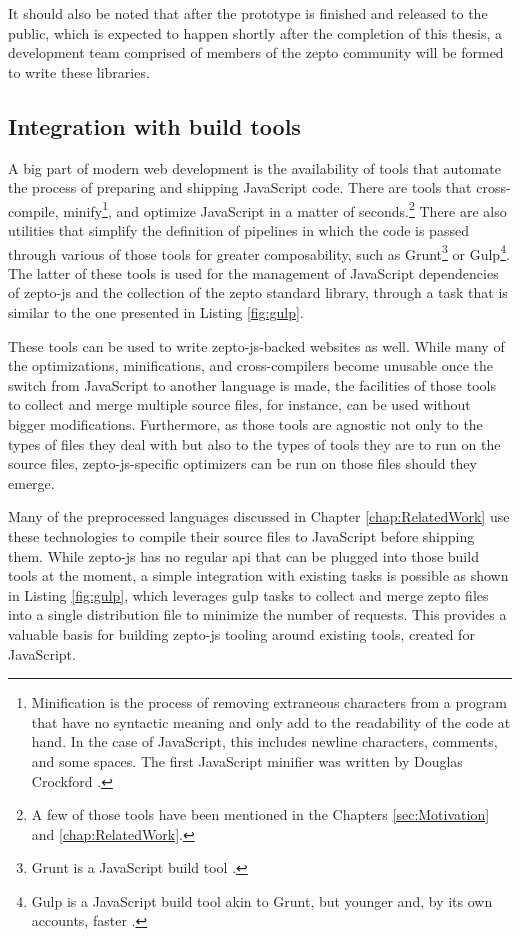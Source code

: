 \documentclass[oneside,11pt,xetex]{scrbook}
\begin{document}
It should also be noted that after the prototype is finished and released to the
public, which is expected to happen shortly after the completion of this thesis,
a development team comprised of members of the zepto community will be formed
to write these libraries.

\subsection{Integration with build tools}
\label{sec:IntegrationTooling}

A big part of modern web development is the availability of tools that automate
the process of preparing and shipping JavaScript code. There are tools that
cross-compile, minify\footnote{Minification is the process of removing extraneous
characters from a program that have no syntactic meaning and only add to the readability
of the code at hand. In the case of JavaScript, this includes newline characters,
comments, and some spaces. The first JavaScript minifier was written by Douglas
Crockford \parencite{JSMIN}.}, and optimize JavaScript in a matter of
seconds.\footnote{A few of those tools have been mentioned in the Chapters
\ref{sec:Motivation} and \ref{chap:RelatedWork}.} There are also utilities that
simplify the definition of pipelines in which the code is passed through various
of those tools for greater composability, such as Grunt\footnote{Grunt is a JavaScript
build tool \parencite{GRUNT}.} or Gulp\footnote{Gulp is a JavaScript build
tool akin to Grunt, but younger and, by its own accounts, faster \parencite{GULP}.}.
The latter of these tools is used for the management of JavaScript dependencies of
zepto-js and the collection of the zepto standard library, through a task that is
similar to the one presented in Listing \ref{fig:gulp}.

These tools can be used to write zepto-js-backed websites as well. While many of
the optimizations, minifications, and cross-compilers become unusable once the switch
from JavaScript to another language is made, the facilities of those tools to collect
and merge multiple source files, for instance, can be used without bigger modifications.
Furthermore, as those tools are agnostic not only to the types of files they deal with
but also to the types of tools they are to run on the source files, zepto-js-specific
optimizers can be run on those files should they emerge.

Many of the preprocessed languages discussed in Chapter \ref{chap:RelatedWork} use these
technologies to compile their source files to JavaScript before shipping them.
While zepto-js has no regular \gls{api} that can be plugged into those build tools
at the moment, a simple integration with existing tasks is possible as shown in
Listing \ref{fig:gulp}, which leverages gulp tasks to collect and merge zepto
files into a single distribution file to minimize the number of requests.
This provides a valuable basis for building zepto-js tooling around existing
tools, created for JavaScript.
\end{document}

